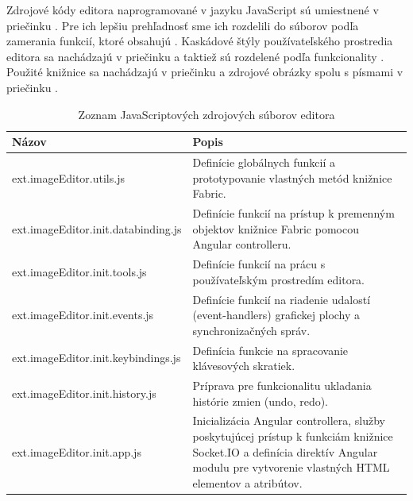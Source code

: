 Zdrojové kódy editora naprogramované v jazyku JavaScript sú umiestnené v priečinku . Pre ich lepšiu prehľadnosť sme ich rozdelili do súborov podľa zamerania funkcií, ktoré obsahujú . Kaskádové štýly používateľského prostredia editora sa nachádzajú v priečinku  a taktiež sú rozdelené podľa funkcionality . Použité knižnice sa nachádzajú v priečinku  a zdrojové obrázky spolu s písmami v priečinku .

\begin{table}
	\begin{tabular}{ | m{6cm} | m{6.5cm} | } \hline
		\textbf{Názov} & \textbf{Popis} \\ \hline \hline
		
		ext.imageEditor.utils.js & Definície globálnych funkcií a prototypovanie vlastných metód knižnice Fabric. \\\hline
		ext.imageEditor.init.databinding.js & Definície funkcií na prístup k premenným objektov knižnice Fabric pomocou Angular controlleru. \\\hline
		ext.imageEditor.init.tools.js & Definície funkcií na prácu s používateľským prostredím editora. \\\hline
		ext.imageEditor.init.events.js & Definície funkcií na riadenie udalostí (event-handlers) grafickej plochy a synchronizačných správ. \\\hline
		ext.imageEditor.init.keybindings.js & Definícia funkcie na spracovanie klávesových skratiek. \\\hline
		ext.imageEditor.init.history.js & Príprava pre funkcionalitu ukladania histórie zmien (undo, redo). \\\hline
		ext.imageEditor.init.app.js & Inicializácia Angular controllera, služby poskytujúcej prístup k funkciám knižnice Socket.IO a definícia direktív Angular modulu pre vytvorenie vlastných HTML elementov a atribútov. \\\hline
		
		\hline
	\end{tabular}
	\caption{Zoznam JavaScriptových zdrojových súborov editora}
	\label{tab:editor-scripts-files}
\end{table}

